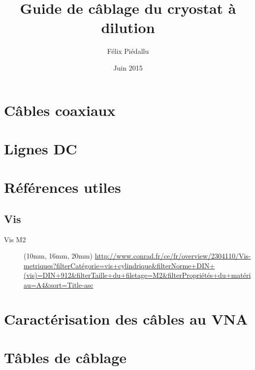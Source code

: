 \documentclass[a4paper,11pt]{article}
\title{Guide de câblage du cryostat à dilution}
\author{Félix Piédallu}
\date{Juin 2015}
\begin{document}
\maketitle
\tableofcontents


\section{Câbles coaxiaux}


\newpage
\section{Lignes DC}


\section{Références utiles}
\subsection{Vis}
\begin{description}
    \item[Vis M2] (10mm, 16mm, 20mm) \url{http://www.conrad.fr/ce/fr/overview/2304110/Vis-metriques?filterCatégorie=vis+cylindrique&filterNorme+DIN+(vis)=DIN+912&filterTaille+du+filetage=M2&filterPropriétés+du+matériau=A4&sort=Title-asc} 
\end{description}


\section{Caractérisation des câbles au VNA}


\newpage \section{Tâbles de câblage} 
\end{document}
